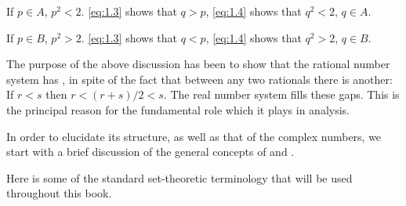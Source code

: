 If $p\in A$, $p^2<2$. \ref{eq:1.3} shows that $q>p$, \ref{eq:1.4} shows that $q^2<2$, $q\in A$.

If $p\in B$, $p^2>2$. \ref{eq:1.3} shows that $q<p$, \ref{eq:1.4} shows that $q^2>2$, $q\in B$.


\begin{myremark}
    \label{myremark:1.2}
    The purpose of the above discussion has been to show that
    the rational number system has ,
    in spite of the fact that between any two rationals there is another:
    If $r<s$ then $r<(r+s)/2<s$.
    The real number system fills these gaps.
    This is the principal reason for the fundamental role
    which it plays in analysis.
\end{myremark}


In order to elucidate its structure, as well as that of the complex numbers,
we start with a brief discussion of the general concepts of  and .


Here is some of the standard set-theoretic terminology that will be used throughout this book.


